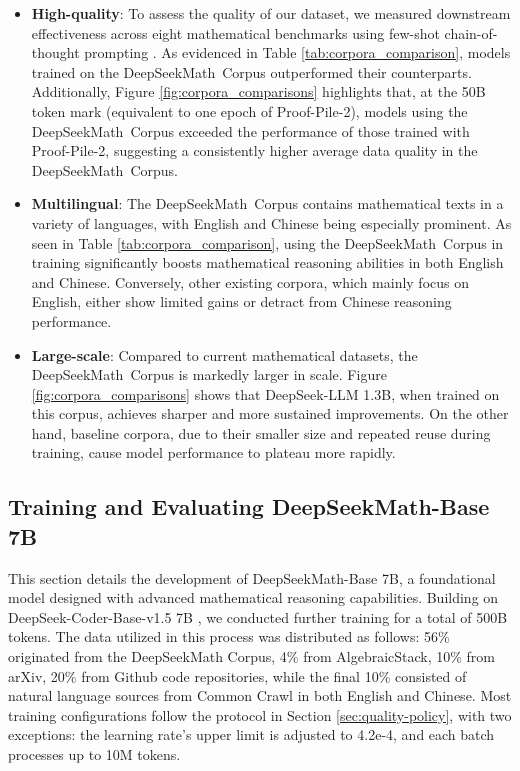 \begin{itemize}[topsep=0pt]
\begin{itemize}[topsep=0pt]
    \item \textbf{High-quality}:
    To assess the quality of our dataset, we measured downstream effectiveness across eight mathematical benchmarks using few-shot chain-of-thought prompting \cite{cot}. As evidenced in Table \ref{tab:corpora_comparison}, models trained on the DeepSeekMath~Corpus outperformed their counterparts. Additionally, Figure \ref{fig:corpora_comparisons} highlights that, at the 50B token mark (equivalent to one epoch of Proof-Pile-2), models using the DeepSeekMath~Corpus exceeded the performance of those trained with Proof-Pile-2, suggesting a consistently higher average data quality in the DeepSeekMath~Corpus. 
    \item \textbf{Multilingual}:
    The DeepSeekMath~Corpus contains mathematical texts in a variety of languages, with English and Chinese being especially prominent. As seen in Table \ref{tab:corpora_comparison}, using the DeepSeekMath~Corpus in training significantly boosts mathematical reasoning abilities in both English and Chinese. Conversely, other existing corpora, which mainly focus on English, either show limited gains or detract from Chinese reasoning performance.
    \item \textbf{Large-scale}:
    Compared to current mathematical datasets, the DeepSeekMath~Corpus is markedly larger in scale. Figure \ref{fig:corpora_comparisons} shows that DeepSeek-LLM 1.3B, when trained on this corpus, achieves sharper and more sustained improvements. On the other hand, baseline corpora, due to their smaller size and repeated reuse during training, cause model performance to plateau more rapidly.
\end{itemize}

\subsection{Training and Evaluating DeepSeekMath-Base 7B}

This section details the development of DeepSeekMath-Base 7B, a foundational model designed with advanced mathematical reasoning capabilities. Building on DeepSeek-Coder-Base-v1.5 7B \citep{deepseek-coder}, we conducted further training for a total of 500B tokens. The data utilized in this process was distributed as follows: 56\% originated from the DeepSeekMath Corpus, 4\% from AlgebraicStack, 10\% from arXiv, 20\% from Github code repositories, while the final 10\% consisted of natural language sources from Common Crawl in both English and Chinese. Most training configurations follow the protocol in Section \ref{sec:quality-policy}, with two exceptions: the learning rate's upper limit is adjusted to 4.2e-4, and each batch processes up to 10M tokens.


\end{itemize}
